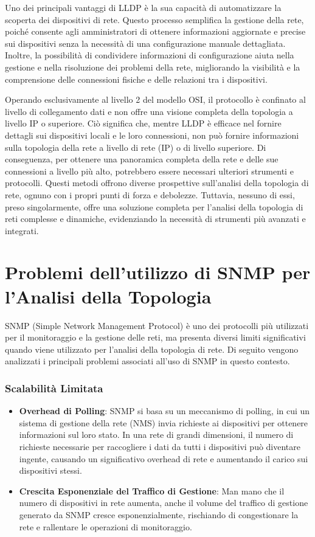 \documentclass[target=bach,aauheader=,style=]{thud}
\begin{document}
Uno dei principali vantaggi di LLDP è la sua capacità di automatizzare la scoperta dei dispositivi di rete. Questo processo semplifica la gestione della rete, poiché consente agli amministratori di ottenere informazioni aggiornate e precise sui dispositivi senza la necessità di una configurazione manuale dettagliata. Inoltre, la possibilità di condividere informazioni di configurazione aiuta nella gestione e nella risoluzione dei problemi della rete, migliorando la visibilità e la comprensione delle connessioni fisiche e delle relazioni tra i dispositivi.

Operando esclusivamente al livello 2 del modello OSI, il protocollo è confinato al livello di collegamento dati e non offre una visione completa della topologia a livello IP o superiore. Ciò significa che, mentre LLDP è efficace nel fornire dettagli sui dispositivi locali e le loro connessioni, non può fornire informazioni sulla topologia della rete a livello di rete (IP) o di livello superiore. Di conseguenza, per ottenere una panoramica completa della rete e delle sue connessioni a livello più alto, potrebbero essere necessari ulteriori strumenti e protocolli.
\newline
\newline
Questi metodi offrono diverse prospettive sull'analisi della topologia di rete, ognuno con i propri punti di forza e debolezze. Tuttavia, nessuno di essi, preso singolarmente, offre una soluzione completa per l'analisi della topologia di reti complesse e dinamiche, evidenziando la necessità di strumenti più avanzati e integrati.

\section{Problemi dell'utilizzo di SNMP per l'Analisi della Topologia}
SNMP (Simple Network Management Protocol) è uno dei protocolli più utilizzati per il monitoraggio e la gestione delle reti, ma presenta diversi limiti significativi quando viene utilizzato per l'analisi della topologia di rete. Di seguito vengono analizzati i principali problemi associati all'uso di SNMP in questo contesto.

\subsubsection{Scalabilità Limitata}
    \begin{itemize}
      \item \textbf{Overhead di Polling}: SNMP si basa su un meccanismo di polling, in cui un sistema di gestione della rete (NMS) invia richieste ai dispositivi per ottenere informazioni sul loro stato. In una rete di grandi dimensioni, il numero di richieste necessarie per raccogliere i dati da tutti i dispositivi può diventare ingente, causando un significativo overhead di rete e aumentando il carico sui dispositivi stessi.
      \item \textbf{Crescita Esponenziale del Traffico di Gestione}: Man mano che il numero di dispositivi in rete aumenta, anche il volume del traffico di gestione generato da SNMP cresce esponenzialmente, rischiando di congestionare la rete e rallentare le operazioni di monitoraggio.
    \end{itemize}
\end{document}
